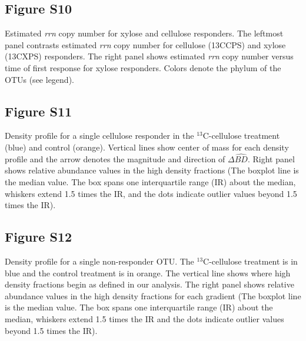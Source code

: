 \subsection{Figure S10}
Estimated \textit{rrn} copy number for xylose and cellulose responders. The leftmost panel contrasts estimated \textit{rrn} copy number for cellulose (13CCPS) and xylose (13CXPS) responders. The right panel shows estimated \textit{rrn} copy number versus time of first response for xylose responders. Colors denote the phylum of the OTUs (see legend).  \subsection{Figure S11}
Density profile for a single cellulose responder in the $^{13}$C-cellulose
treatment (blue) and control (orange). Vertical lines show center of mass for
each density profile and the arrow denotes the magnitude and direction of
$\Delta\hat{BD}$. Right panel shows relative abundance values in the high
density fractions (The boxplot line is the median value. The box spans one
interquartile range (IR) about the median, whiskers extend 1.5 times the IR,
and the dots indicate outlier values beyond 1.5 times the IR).   

\subsection{Figure S12}
Density profile for a single non-responder OTU. The $^{13}$C-cellulose
treatment is in blue and the control treatment is in orange. The vertical line
shows where high density fractions begin as defined in our analysis. The right
panel shows relative abundance values in the high density fractions for each
gradient (The boxplot line is the median value. The box spans one
interquartile range (IR) about the median, whiskers extend 1.5 times the IR
and the dots indicate outlier values beyond 1.5 times the IR).  

